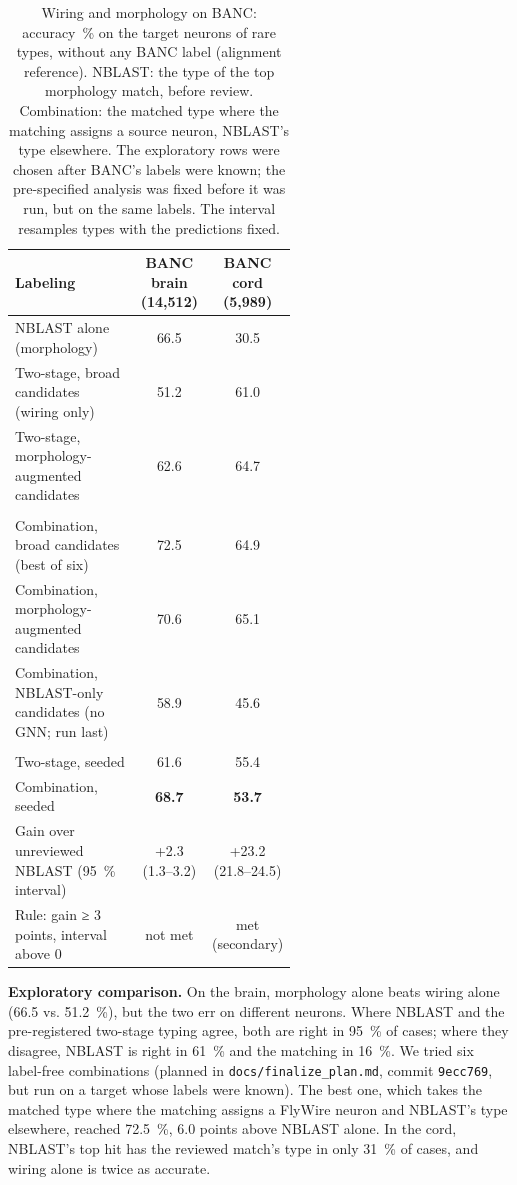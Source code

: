\documentclass[11pt,a4paper]{article}
\begin{document}
\begin{table}[tbp]
\centering
\footnotesize
\caption{Wiring and morphology on BANC: accuracy~\% on the target neurons of rare types, without any BANC label (alignment reference). NBLAST: the type of the top morphology match, before review. Combination: the matched type where the matching assigns a source neuron, NBLAST's type elsewhere. The exploratory rows were chosen after BANC's labels were known; the pre-specified analysis was fixed before it was run, but on the same labels. The interval resamples types with the predictions fixed.}\label{tab:morph}
\begin{tabularx}{\linewidth}{>{\raggedright\arraybackslash}p{0.56\linewidth}CC}
\toprule
Labeling & BANC brain (14,512) & BANC cord (5,989) \\
\midrule
NBLAST alone (morphology) & 66.5 & 30.5 \\
Two-stage, broad candidates (wiring only) & 51.2 & 61.0 \\
Two-stage, morphology-augmented candidates & 62.6 & 64.7 \\
\midrule
{} \\
Combination, broad candidates (best of six) & 72.5 & 64.9 \\
Combination, morphology-augmented candidates & 70.6 & 65.1 \\
Combination, NBLAST-only candidates (no GNN; run last) & 58.9 & 45.6 \\
\midrule
{} \\
Two-stage, seeded & 61.6 & 55.4 \\
Combination, seeded & \textbf{68.7} & \textbf{53.7} \\
Gain over unreviewed NBLAST (95~\% interval) & +2.3 (1.3–3.2) & +23.2 (21.8–24.5) \\
Rule: gain ≥ 3 points, interval above 0 & not met & met (secondary) \\
\bottomrule
\end{tabularx}
\end{table}

\textbf{Exploratory comparison.} On the brain, morphology alone beats wiring alone (66.5 vs. 51.2~\%), but the two err on different neurons. Where NBLAST and the pre-registered two-stage typing agree, both are right in 95~\% of cases; where they disagree, NBLAST is right in 61~\% and the matching in 16~\%. We tried six label-free combinations (planned in \texttt{docs/\allowbreak{}finalize\_\allowbreak{}plan.md}, commit \texttt{9ecc769}, but run on a target whose labels were known). The best one, which takes the matched type where the matching assigns a FlyWire neuron and NBLAST's type elsewhere, reached 72.5~\%, 6.0 points above NBLAST alone. In the cord, NBLAST's top hit has the reviewed match's type in only 31~\% of cases, and wiring alone is twice as accurate.
\end{document}
